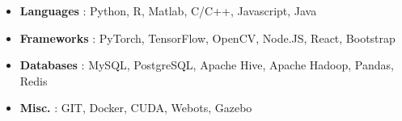 \begin{cventries}  
\skillentry
    {
        \begin{itemize}
            \item \textbf{Languages} : Python, R, Matlab, C/C++, Javascript, Java
            \item \textbf{Frameworks} : PyTorch, TensorFlow, OpenCV, Node.JS, React, Bootstrap
            \item \textbf{Databases} : MySQL, PostgreSQL, Apache Hive, Apache Hadoop, Pandas, Redis
            \item \textbf{Misc.} : GIT, Docker, CUDA, Webots, Gazebo
        \end{itemize}
    }
    

\end{cventries}
\vspace{0.5 cm}